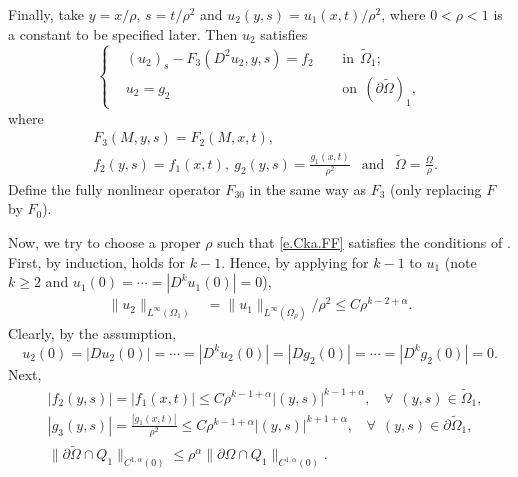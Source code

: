 \documentclass[preprint,12pt]{elsarticle}
\theoremstyle{definition}
\theoremstyle{remark}
\numberwithin{equation}{section}
\begin{document}
Finally, take $y=x/\rho$, $s=t/\rho^2$ and $u_2(y,s)=u_1(x,t)/\rho^2$, where $0<\rho<1$ is a constant to be specified later. Then $u_2$ satisfies
\begin{equation}\label{e.Cka.FF}
\left\{\begin{aligned}
&(u_2)_s-F_3(D^2u_2,y,s)=f_2&& ~~\mbox{in}~~\tilde{\Omega}_1;\\
&u_2=g_2&& ~~\mbox{on}~~(\partial \tilde{\Omega})_1,
\end{aligned}\right.
\end{equation}
where
\begin{equation*}
  \begin{aligned}
&F_3(M,y,s)=F_2(M,x,t),\\
&f_2(y,s)=f_1(x,t),~ g_2(y,s)=\frac{g_1(x,t)}{\rho^2}~~\mbox{ and }~~ \tilde{\Omega}=\frac{\Omega}{\rho}.
\end{aligned}
\end{equation*}
Define the fully nonlinear operator $F_{30}$ in the same way as $F_3$ (only replacing $F$ by $F_0$).

Now, we try to choose a proper $\rho$ such that \cref{e.Cka.FF} satisfies the conditions of . First, by induction,  holds for $k-1$. Hence, by applying  for $k-1$ to $u_1$ (note $k\geq 2$ and $u_1(0)=\cdots=|D^{k}u_1(0)|=0$),
\begin{equation*}
  \begin{aligned}
    \|u_2\|_{L^{\infty}(\Omega_1)}&= \|u_1\|_{L^{\infty}(\Omega_\rho)}/\rho^2
    \leq C\rho^{k-2+\alpha}.
  \end{aligned}
\end{equation*}
Clearly, by the assumption,
\begin{equation*}
  u_2(0)=|Du_2(0)|=\cdots=|D^{k}u_2(0)|=|Dg_2(0)|=\cdots=|D^{k}g_2(0)|=0.
\end{equation*}
Next,
\begin{equation*}
\begin{aligned}
&|f_2(y,s)|=|f_1(x,t)|
\leq C\rho^{k-1+\alpha}
|(y,s)|^{k-1+\alpha},~~~~\forall~~(y,s)\in\tilde{\Omega}_1,\\
&|g_3(y,s)|=\frac{|g_1(x,t)|}{\rho^2}\leq C\rho^{k-1+\alpha}|(y,s)|^{k+1+\alpha},~~~~\forall~~(y,s)\in\partial \tilde{\Omega}_1,\\
&\|\partial \tilde{\Omega}\cap Q_1\|_{C^{1,\alpha}(0)}\leq \rho^{\alpha}\|\partial \Omega\cap Q_1\|_{C^{1,\alpha}(0)}.
\end{aligned}
\end{equation*}
\end{document}
